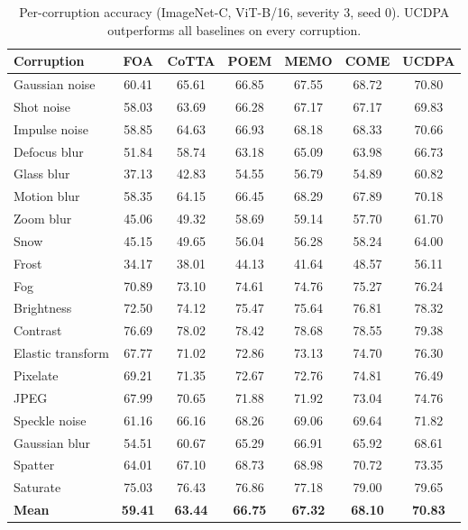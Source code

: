 \begin{table}[h]
\centering
\small
\caption{Per-corruption accuracy (ImageNet-C, ViT-B/16, severity 3, seed 0). UCDPA outperforms all baselines on every corruption.}
\label{tab:per-corruption}
\begin{tabular}{lcccccc}
\toprule
Corruption & FOA & CoTTA & POEM & MEMO & COME & UCDPA \\
\midrule
Gaussian noise & 60.41 & 65.61 & 66.85 & 67.55 & 68.72 & 70.80 \\
Shot noise & 58.03 & 63.69 & 66.28 & 67.17 & 67.17 & 69.83 \\
Impulse noise & 58.85 & 64.63 & 66.93 & 68.18 & 68.33 & 70.66 \\
Defocus blur & 51.84 & 58.74 & 63.18 & 65.09 & 63.98 & 66.73 \\
Glass blur & 37.13 & 42.83 & 54.55 & 56.79 & 54.89 & 60.82 \\
Motion blur & 58.35 & 64.15 & 66.45 & 68.29 & 67.89 & 70.18 \\
Zoom blur & 45.06 & 49.32 & 58.69 & 59.14 & 57.70 & 61.70 \\
Snow & 45.15 & 49.65 & 56.04 & 56.28 & 58.24 & 64.00 \\
Frost & 34.17 & 38.01 & 44.13 & 41.64 & 48.57 & 56.11 \\
Fog & 70.89 & 73.10 & 74.61 & 74.76 & 75.27 & 76.24 \\
Brightness & 72.50 & 74.12 & 75.47 & 75.64 & 76.81 & 78.32 \\
Contrast & 76.69 & 78.02 & 78.42 & 78.68 & 78.55 & 79.38 \\
Elastic transform & 67.77 & 71.02 & 72.86 & 73.13 & 74.70 & 76.30 \\
Pixelate & 69.21 & 71.35 & 72.67 & 72.76 & 74.81 & 76.49 \\
JPEG & 67.99 & 70.65 & 71.88 & 71.92 & 73.04 & 74.76 \\
Speckle noise & 61.16 & 66.16 & 68.26 & 69.06 & 69.64 & 71.82 \\
Gaussian blur & 54.51 & 60.67 & 65.29 & 66.91 & 65.92 & 68.61 \\
Spatter & 64.01 & 67.10 & 68.73 & 68.98 & 70.72 & 73.35 \\
Saturate & 75.03 & 76.43 & 76.86 & 77.18 & 79.00 & 79.65 \\
\midrule
\textbf{Mean} & \textbf{59.41} & \textbf{63.44} & \textbf{66.75} & \textbf{67.32} & \textbf{68.10} & \textbf{70.83} \\
\bottomrule
\end{tabular}
\end{table}

